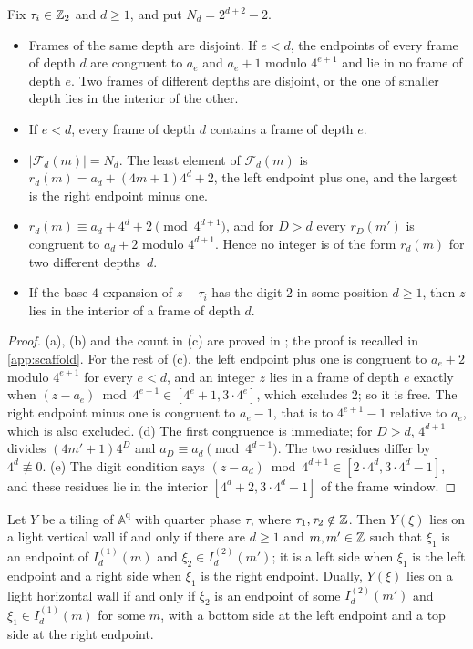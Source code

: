 \begin{lemma}[Frames]\label{scf:frames}
Fix $\tau_i\in\mathbb{Z}_2$ and $d\ge1$, and put $N_d=2^{d+2}-2$.
\begin{itemize}
\item[(a)] Frames of the same depth are disjoint. If $e<d$, the endpoints of every frame of depth $d$ are congruent to $a_e$ and $a_e+1$ modulo $4^{e+1}$ and lie in no frame of depth $e$. Two frames of different depths are disjoint, or the one of smaller depth lies in the interior of the other.
\item[(b)] If $e<d$, every frame of depth $d$ contains a frame of depth $e$.
\item[(c)] $|\mathcal F_d(m)|=N_d$. The least element of $\mathcal F_d(m)$ is $r_d(m)=a_d+(4m+1)4^d+2$, the left endpoint plus one, and the largest is the right endpoint minus one.
\item[(d)] $r_d(m)\equiv a_d+4^d+2\pmod{4^{d+1}}$, and for $D>d$ every $r_D(m')$ is congruent to $a_d+2$ modulo $4^{d+1}$. Hence no integer is of the form $r_d(m)$ for two different depths~$d$.
\item[(e)] If the base-$4$ expansion of $z-\tau_i$ has the digit $2$ in some position $d\ge1$, then $z$ lies in the interior of a frame of depth $d$.
\end{itemize}
\end{lemma}

\begin{proof}
(a), (b) and the count in (c) are proved in \cite{DM26forget}; the proof is recalled in \cref{app:scaffold}. For the rest of (c), the left endpoint plus one is congruent to $a_e+2$ modulo $4^{e+1}$ for every $e<d$, and an integer $z$ lies in a frame of depth $e$ exactly when $(z-a_e)\bmod 4^{e+1}\in[4^e+1,3\cdot4^e]$, which excludes $2$; so it is free. The right endpoint minus one is congruent to $a_e-1$, that is to $4^{e+1}-1$ relative to $a_e$, which is also excluded. (d) The first congruence is immediate; for $D>d$, $4^{d+1}$ divides $(4m'+1)4^D$ and $a_D\equiv a_d\pmod{4^{d+1}}$. The two residues differ by $4^d\not\equiv0$. (e) The digit condition says $(z-a_d)\bmod4^{d+1}\in[2\cdot4^d,3\cdot4^d-1]$, and these residues lie in the interior $[4^d+2,3\cdot4^d-1]$ of the frame window.
\end{proof}

\begin{lemma}\label{scf:walls}
Let $Y$ be a tiling of $\mathbb A^{\mathrm q}$ with quarter phase $\tau$, where $\tau_1,\tau_2\notin\mathbb{Z}$. Then $Y(\xi)$ lies on a light vertical wall if and only if there are $d\ge1$ and $m,m'\in\mathbb{Z}$ such that $\xi_1$ is an endpoint of $I^{(1)}_d(m)$ and $\xi_2\in I^{(2)}_d(m')$; it is a left side when $\xi_1$ is the left endpoint and a right side when $\xi_1$ is the right endpoint. Dually, $Y(\xi)$ lies on a light horizontal wall if and only if $\xi_2$ is an endpoint of some $I^{(2)}_d(m')$ and $\xi_1\in I^{(1)}_d(m)$ for some $m$, with a bottom side at the left endpoint and a top side at the right endpoint.
\end{lemma}

